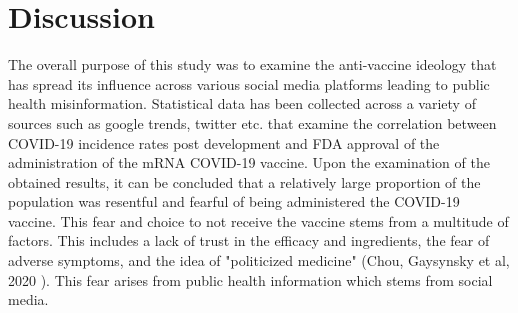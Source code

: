 \documentclass[10pt,twocolumn,letterpaper]{article}
\begin{document}
\section{Discussion}
The overall purpose of this study was to examine the anti-vaccine ideology that has spread its influence across various social media platforms leading to public health misinformation. Statistical data has been collected across a variety of sources such as google trends, twitter etc. that examine the correlation between COVID-19 incidence rates post development and FDA approval of the administration of the mRNA COVID-19 vaccine. Upon the examination of the obtained results, it can be concluded that a relatively large proportion of the population was resentful and fearful of being administered the COVID-19 vaccine. This fear and choice to not receive the vaccine stems from a multitude of factors. This includes a lack of trust in the efficacy and ingredients, the fear of adverse symptoms, and the idea of "politicized medicine" (Chou, Gaysynsky et al, 2020 ). This fear arises from public health information which stems from social media.
 
\end{document}
